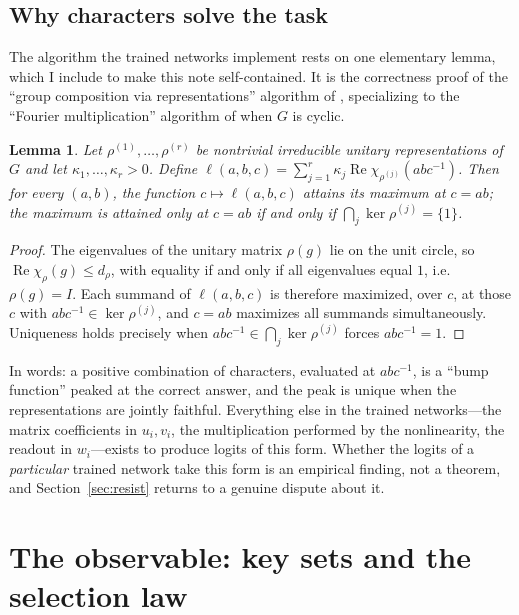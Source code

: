 \documentclass[11pt]{amsart}
\theoremstyle{plain}
\newtheorem{lemma}[theorem]{Lemma}
\theoremstyle{definition}
\begin{document}
\subsection{Why characters solve the task}\label{sec:gcr}
The algorithm the trained networks implement rests on one elementary lemma, which I include to make this note self-contained. It is the correctness proof of the ``group composition via representations'' algorithm of \cite{chughtai2023}, specializing to the ``Fourier multiplication'' algorithm of \cite{nanda2023} when $G$ is cyclic.

\begin{lemma}\label{lem:gcr}
Let $\rho^{(1)}, \dots, \rho^{(r)}$ be nontrivial irreducible unitary representations of $G$ and let $\kappa_1, \dots, \kappa_r > 0$. Define $\ell(a,b,c) = \sum_{j=1}^r \kappa_j \operatorname{Re} \chi_{\rho^{(j)}}(abc^{-1})$. Then for every $(a,b)$, the function $c \mapsto \ell(a,b,c)$ attains its maximum at $c = ab$; the maximum is attained \emph{only} at $c = ab$ if and only if $\bigcap_j \ker \rho^{(j)} = \{1\}$.
\end{lemma}

\begin{proof}
The eigenvalues of the unitary matrix $\rho(g)$ lie on the unit circle, so $\operatorname{Re} \chi_\rho(g) \leq d_\rho$, with equality if and only if all eigenvalues equal $1$, i.e.\ $\rho(g) = I$. Each summand of $\ell(a,b,c)$ is therefore maximized, over $c$, at those $c$ with $abc^{-1} \in \ker \rho^{(j)}$, and $c = ab$ maximizes all summands simultaneously. Uniqueness holds precisely when $abc^{-1} \in \bigcap_j \ker \rho^{(j)}$ forces $abc^{-1} = 1$.
\end{proof}

In words: a positive combination of characters, evaluated at $abc^{-1}$, is a ``bump function'' peaked at the correct answer, and the peak is unique when the representations are jointly faithful. Everything else in the trained networks---the matrix coefficients in $u_i, v_i$, the multiplication performed by the nonlinearity, the readout in $w_i$---exists to produce logits of this form. Whether the logits of a \emph{particular} trained network take this form is an empirical finding, not a theorem, and Section~\ref{sec:resist} returns to a genuine dispute about it.

\section{The observable: key sets and the selection law}\label{sec:observables}
\end{document}
